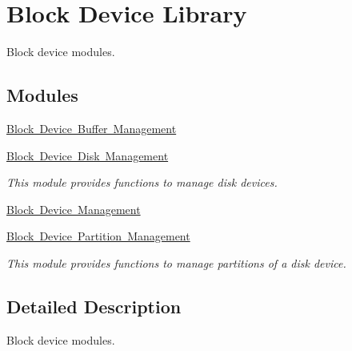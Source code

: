 \hypertarget{group__rtems__libblock}{}\section{Block Device Library}
\label{group__rtems__libblock}


Block device modules.  


\subsection*{Modules}
\begin{DoxyCompactItemize}
\item 
\mbox{\hyperlink{group__rtems__bdbuf}{Block Device Buffer Management}}
\item 
\mbox{\hyperlink{group__rtems__disk}{Block Device Disk Management}}
\begin{DoxyCompactList}\small\item\em This module provides functions to manage disk devices. \end{DoxyCompactList}\item 
\mbox{\hyperlink{group__rtems__blkdev}{Block Device Management}}
\item 
\mbox{\hyperlink{group__rtems__bdpart}{Block Device Partition Management}}
\begin{DoxyCompactList}\small\item\em This module provides functions to manage partitions of a disk device. \end{DoxyCompactList}\end{DoxyCompactItemize}


\subsection{Detailed Description}
Block device modules. 

